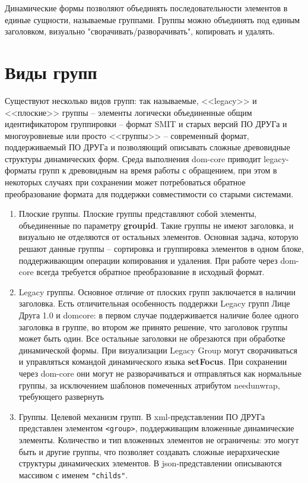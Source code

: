 \documentclass[../index.tex]{subfiles}
\begin{document}
	Динамические формы позволяют объединять последовательности элементов в единые сущности, называемые группами. Группы можно объединять под единым заголовком, визуально "сворачивать/разворачивать", копировать и удалять.

\section{Виды групп}
    	Существуют несколько видов групп: так называемые, <<legacy>> и <<плоские>> группы -- элементы логически объединенные общим идентификатором группировки -- формат SMIT и старых версий  ПО ДРУГа и многоуровневые или просто <<группы>> -- современный формат, поддерживаемый ПО ДРУГа и позволяющий описывать сложные древовидные структуры динамических форм. Среда выполнения dom-core
    	приводит legacy-форматы групп к древовидным на время работы с обращением, при этом в некоторых случаях при сохранении может потребоваться обратное преобразование формата для поддержки совместимости со старыми системами.
\begin{enumerate}
    \item Плоские группы. Плоские группы представляют собой элементы, объединенные по параметру \textbf{groupid}. Такие группы не имеют заголовка, и визуально не отделяются от остальных элементов. Основная задача, которую решают данные группы -- сортировка и группировка элементов в одном блоке, поддерживающим операции копирования и удаления. При работе через dom-core всегда требуется обратное преобразование в исходный формат.
    \item Legacy группы. Основное отличие от плоских групп заключается в наличии заголовка. Есть отличительная особенность поддержки Legacy групп Лице Друга 1.0 и domcore: в первом случае поддерживается наличие более одного заголовка в группе, во втором же принято решение, что заголовок группы может быть один. Все остальные заголовки не обрезаются при обработке динамической формы. При визуализации Legacy Group могут сворачиваться и управляться командой динамического языка \textbf{setFocus}. При сохранении через dom-core они могут не разворачиваться и отправляться как нормальные группы, за исключением шаблонов помеченных атрибутом needunwrap, требующего развернуть
    \item Группы. Целевой механизм групп. В xml-представлении ПО ДРУГа представлен элементом \verb|<group>|, поддерживащим вложенные
    динамические элементы. Количество и тип вложенных элементов не ограничены: это могут быть и другие группы, что позволяет создавать сложные иерархические структуры динамических элементов. В json-представлении описываются массивом с именем \verb|"childs"|.
\end{enumerate}
\end{document}
